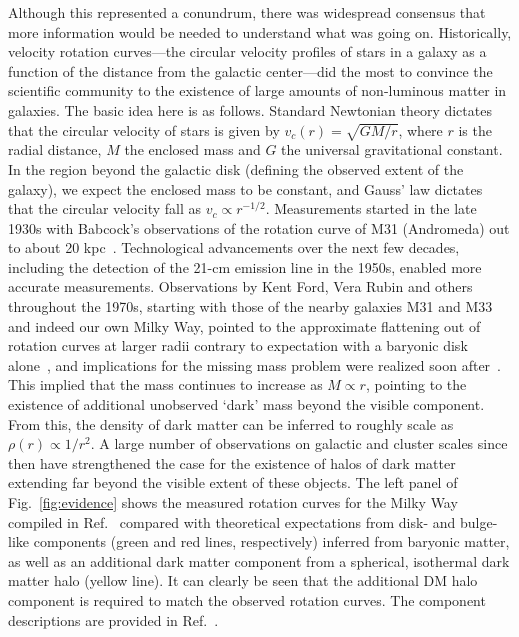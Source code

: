 Although this represented a conundrum, there was widespread consensus that more information would be needed to understand what was going on. Historically, velocity rotation curves---the circular velocity profiles of stars in a galaxy as a function of the distance from the galactic center---did the most to convince the scientific community to the existence of large amounts of non-luminous matter in galaxies. The basic idea here is as follows. Standard Newtonian theory dictates that the circular velocity of stars is given by $v_c(r) = \sqrt{GM/r}$, where $r$ is the radial distance, $M$ the enclosed mass and $G$ the universal gravitational constant. In the region beyond the galactic disk (defining the observed extent of the galaxy), we expect the enclosed mass to be constant, and Gauss' law dictates that the circular velocity fall as $v_c \propto r^{-1/2}$. Measurements started in the late 1930s with Babcock's observations of the rotation curve of M31 (Andromeda) out to about 20 kpc~\cite{1939LicOB..19...41B}. Technological advancements over the next few decades, including the detection of the 21-cm emission line in the 1950s, enabled more accurate measurements. Observations by Kent Ford, Vera Rubin and others throughout the 1970s, starting with those of the nearby galaxies M31 and M33 and indeed our own Milky Way, pointed to the approximate flattening out of rotation curves at larger radii contrary to expectation with a baryonic disk alone~\cite{1970ApJ...159..379R,1973A&A....26..483R}, and implications for the missing mass problem were realized soon after~\cite{1974Natur.250..309E,1974ApJ...193L...1O}. This implied that the mass continues to increase as $M \propto r$, pointing to the existence of additional unobserved `dark' mass beyond the visible component. From this, the density of dark matter can be inferred to roughly scale as $\rho(r) \propto 1/r^2$. A large number of observations on galactic and cluster scales since then have strengthened the case for the existence of halos of dark matter extending far beyond the visible extent of these objects. The left panel of Fig.~\ref{fig:evidence} shows the measured rotation curves for the Milky Way compiled in Ref.~\cite{2009PASJ...61..227S} compared with theoretical expectations from disk- and bulge-like components (green and red lines, respectively) inferred from baryonic matter, as well as an additional dark matter component from a spherical, isothermal dark matter halo (yellow line). It can clearly be seen that the additional DM halo component is required to match the observed rotation curves. The component descriptions are provided in Ref.~\cite{2009PASJ...61..227S}.

